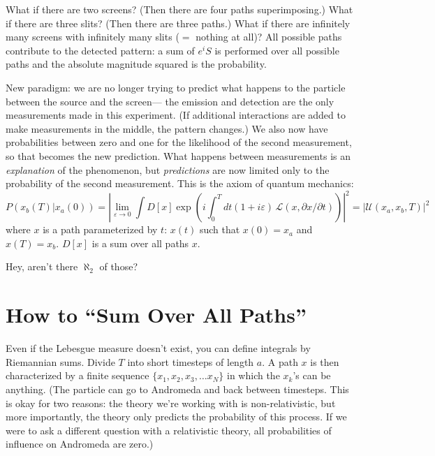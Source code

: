 \documentclass[12pt]{article}
\begin{document}
What if there are two screens?  (Then there are four paths
superimposing.)  What if there are three slits?  (Then there are three
paths.)  What if there are infinitely many screens with infinitely
many slits ($=$ nothing at all)?  All possible paths contribute to the
detected pattern: a sum of $e^iS$ is performed over all possible paths
and the absolute magnitude squared is the probability.

New paradigm: we are no longer trying to predict what happens to the
particle between the source and the screen--- the emission and
detection are the only measurements made in this experiment.  (If
additional interactions are added to make measurements in the middle,
the pattern changes.)  We also now have probabilities between zero and
one for the likelihood of the second measurement, so that becomes the
new prediction.  What happens between measurements is an {\it
explanation} of the phenomenon, but {\it predictions} are now limited
only to the probability of the second measurement.  This is the axiom
of quantum mechanics:
\begin{equation}
  P(x_b(T) | x_a(0)) = \left| \lim_{\varepsilon \to 0} \int D[x] \exp\left( i \int_0^T
  dt (1 + i \varepsilon) \, \mathcal{L}(x, \partial x / \partial t)
  \right) \right|^2 = \left| \mathcal{U}(x_a, x_b, T) \right|^2
\end{equation}
where $x$ is a path parameterized by $t$: $x(t)$ such that $x(0) =
x_a$ and $x(T) = x_b$.  $D[x]$ is a sum over all paths $x$.

Hey, aren't there $\aleph_2$ of those?

\section{How to ``Sum Over All Paths''}

Even if the Lebesgue measure doesn't exist, you can define integrals
by Riemannian sums.  Divide $T$ into short timesteps of length $a$.  A
path $x$ is then characterized by a finite sequence $\{x_1, x_2, x_3,
\ldots x_N\}$ in which the $x_k$'s can be anything.  (The particle can
go to Andromeda and back between timesteps.  This is okay for two
reasons: the theory we're working with is non-relativistic, but more
importantly, the theory only predicts the probability of this process.
If we were to ask a different question with a relativistic theory, all
probabilities of influence on Andromeda are zero.)
\end{document}
